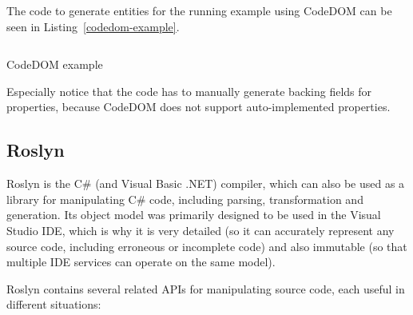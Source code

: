 The code to generate entities for the running example using CodeDOM can be seen in Listing~\ref{codedom-example}.

\begin{listing}
\inputminted[firstline=14,lastline=61]{csharp}{samples/CodeDOM/Program.cs}
\caption{CodeDOM example}
\label{codedom-example}
\end{listing}

Especially notice that the code has to manually generate backing fields for properties, because CodeDOM does not support auto-implemented properties.

\subsection{Roslyn}

Roslyn \cite{roslyn} is the C\# (and Visual Basic .NET) compiler, which can also be used as a library for manipulating C\# code, including parsing, transformation and generation. Its object model was primarily designed to be used in the Visual Studio \ac{IDE}, which is why it is very detailed (so it can accurately represent any source code, including erroneous or incomplete code) and also immutable (so that multiple \ac{IDE} services can operate on the same model).

Roslyn contains several related \acp{API} for manipulating source code, each useful in different situations:

